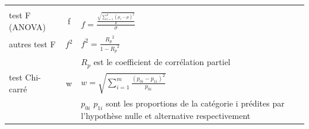 \documentclass[
  12pt,
]{book}
\begin{document}
\begin{longtable}[]{@{}lcl@{}}
\begin{minipage}[t]{0.46\columnwidth}
\end{minipage}\tabularnewline
\begin{minipage}[t]{0.11\columnwidth}\raggedright
test F (ANOVA)\strut
\end{minipage} & \begin{minipage}[t]{0.35\columnwidth}\centering
f\strut
\end{minipage} & \begin{minipage}[t]{0.46\columnwidth}\raggedright
\(f = \frac{\frac{\sqrt{\sum_{i=1}^k (\mu_i - \mu)^2}}{k}}{\sigma}\)\strut
\end{minipage}\tabularnewline
\begin{minipage}[t]{0.11\columnwidth}\raggedright
autres test F\strut
\end{minipage} & \begin{minipage}[t]{0.35\columnwidth}\centering
\(f^2\)\strut
\end{minipage} & \begin{minipage}[t]{0.46\columnwidth}\raggedright
\(f^2 = \frac{{R_p}^2}{1-{R_p}^2}\)\strut
\end{minipage}\tabularnewline
\begin{minipage}[t]{0.11\columnwidth}\raggedright
\strut
\end{minipage} & \begin{minipage}[t]{0.35\columnwidth}\centering
\strut
\end{minipage} & \begin{minipage}[t]{0.46\columnwidth}\raggedright
\({R_p}\) est le coefficient de corrélation partiel\strut
\end{minipage}\tabularnewline
\begin{minipage}[t]{0.11\columnwidth}\raggedright
test Chi-carré\strut
\end{minipage} & \begin{minipage}[t]{0.35\columnwidth}\centering
w\strut
\end{minipage} & \begin{minipage}[t]{0.46\columnwidth}\raggedright
\(w = \sqrt{ \sum_{i=1}^m \frac{(p_{0i} - p_{1i})^2 }{ p_{0i}} }\)\strut
\end{minipage}\tabularnewline
\begin{minipage}[t]{0.11\columnwidth}\raggedright
\strut
\end{minipage} & \begin{minipage}[t]{0.35\columnwidth}\centering
\strut
\end{minipage} & \begin{minipage}[t]{0.46\columnwidth}\raggedright
\(p_{0i}\) \(p_{1i}\) sont les proportions de la catégorie i prédites par l'hypothèse nulle et alternative respectivement\strut
\end{minipage}\tabularnewline
\bottomrule
\end{longtable}
\end{document}
